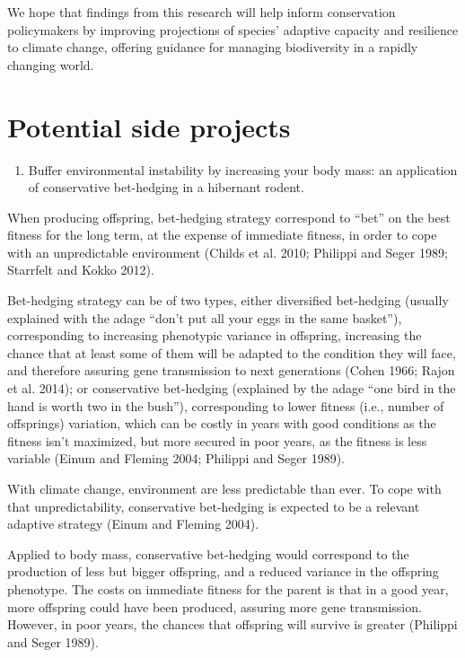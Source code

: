 \documentclass[
  12pt,
  letterpaper,
]{scrartcl}
\providecommand{\tightlist}{%
  \setlength{\itemsep}{0pt}\setlength{\parskip}{0pt}}
\begin{document}
We hope that findings from this research will help inform conservation
policymakers by improving projections of species' adaptive capacity and
resilience to climate change, offering guidance for managing
biodiversity in a rapidly changing world.

\newpage{}

\section{Potential side projects}\label{sec-side-proj}

\begin{enumerate}
\def\labelenumi{\arabic{enumi}.}
\tightlist
\item
  Buffer environmental instability by increasing your body mass: an
  application of conservative bet-hedging in a hibernant rodent.
\end{enumerate}

When producing offspring, bet-hedging strategy correspond to ``bet'' on
the best fitness for the long term, at the expense of immediate fitness,
in order to cope with an unpredictable environment (Childs et al. 2010;
Philippi and Seger 1989; Starrfelt and Kokko 2012).

Bet-hedging strategy can be of two types, either diversified bet-hedging
(usually explained with the adage ``don't put all your eggs in the same
basket''), corresponding to increasing phenotypic variance in offspring,
increasing the chance that at least some of them will be adapted to the
condition they will face, and therefore assuring gene transmission to
next generations (Cohen 1966; Rajon et al. 2014); or conservative
bet-hedging (explained by the adage ``one bird in the hand is worth two
in the bush''), corresponding to lower fitness (i.e., number of
offsprings) variation, which can be costly in years with good conditions
as the fitness isn't maximized, but more secured in poor years, as the
fitness is less variable (Einum and Fleming 2004; Philippi and Seger
1989).

With climate change, environment are less predictable than ever. To cope
with that unpredictability, conservative bet-hedging is expected to be a
relevant adaptive strategy (Einum and Fleming 2004).

Applied to body mass, conservative bet-hedging would correspond to the
production of less but bigger offspring, and a reduced variance in the
offspring phenotype. The costs on immediate fitness for the parent is
that in a good year, more offspring could have been produced, assuring
more gene transmission. However, in poor years, the chances that
offspring will survive is greater (Philippi and Seger 1989).
\end{document}
